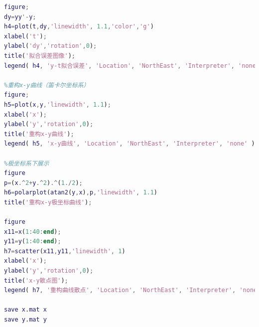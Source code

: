 \documentclass[withoutpreface,bwprint]{cumcmthesis}
\begin{document}
\begin{lstlisting}[language=Matlab]
%误差分析
figure;
dy=yy'-y;
h4=plot(t,dy,'linewidth', 1.1,'color','g')
xlabel('t');
ylabel('dy','rotation',0);
title('拟合误差图像');
legend( h4, 'y-t拟合误差', 'Location', 'NorthEast', 'Interpreter', 'none' );

%重构x-y曲线（笛卡尔坐标系）
figure;
h5=plot(x,y,'linewidth', 1.1);
xlabel('x');
ylabel('y','rotation',0);
title('重构x-y曲线');
legend( h5, 'x-y曲线', 'Location', 'NorthEast', 'Interpreter', 'none' );

%极坐标系下展示
figure
p=(x.^2+y.^2).^(1./2);
h6=polarplot(atan2(y,x),p,'linewidth', 1.1)
title('重构x-y极坐标曲线');

figure
x11=x(1:40:end);
y11=y(1:40:end);
h7=scatter(x11,y11,'linewidth', 1)
xlabel('x');
ylabel('y','rotation',0);
title('x-y散点图');
legend( h7, '重构曲线散点', 'Location', 'NorthEast', 'Interpreter', 'none' );

save x.mat x
save y.mat y
 \end{lstlisting}
 
\end{document}
